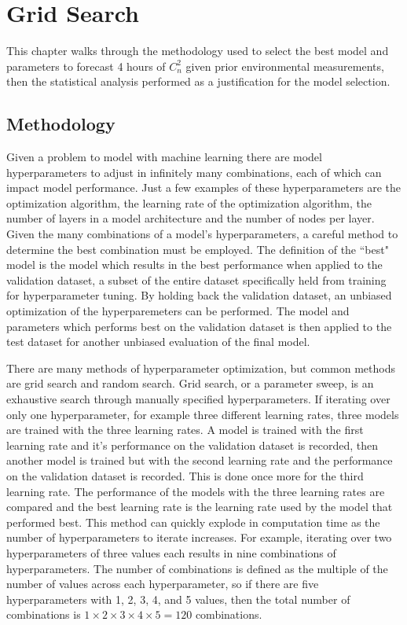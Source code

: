 \chapter{Grid Search}
\label{ch4}
This chapter walks through the methodology used to select the best model and parameters to forecast 4 hours of $C_{n}^{2}$ given prior environmental measurements, then the statistical analysis performed as a justification for the model selection.

\section{Methodology}
\label{sec:grid_search_methodology}
Given a problem to model with machine learning there are model hyperparameters to adjust in infinitely many combinations, each of which can impact model performance. Just a few examples of these hyperparameters are the optimization algorithm, the learning rate of the optimization algorithm, the number of layers in a model architecture and the number of nodes per layer. Given the many combinations of a model's hyperparameters, a careful method to determine the best combination must be employed. The definition of the ``best" model is the model which results in the best performance when applied to the validation dataset, a subset of the entire dataset specifically held from training for hyperparameter tuning. By holding back the validation dataset, an unbiased optimization of the hyperparemeters can be performed. The model and parameters which performs best on the validation dataset is then applied to the test dataset for another unbiased evaluation of the final model.

There are many methods of hyperparameter optimization, but common methods are grid search and random search. Grid search, or a parameter sweep, is an exhaustive search through manually specified hyperparameters. If iterating over only one hyperparameter, for example three different learning rates, three models are trained with the three learning rates. A model is trained with the first learning rate and it's performance on the validation dataset is recorded, then another model is trained but with the second learning rate and the performance on the validation dataset is recorded. This is done once more for the third learning rate. The performance of the models with the three learning rates are compared and the best learning rate is the learning rate used by the model that performed best. This method can quickly explode in computation time as the number of hyperparameters to iterate increases. For example, iterating over two hyperparameters of three values each results in nine combinations of hyperparameters. The number of combinations is defined as the multiple of the number of values across each hyperparameter, so if there are five hyperparameters with 1, 2, 3, 4, and 5 values, then the total number of combinations is $1 \times 2 \times 3 \times 4 \times 5 = 120$ combinations.

